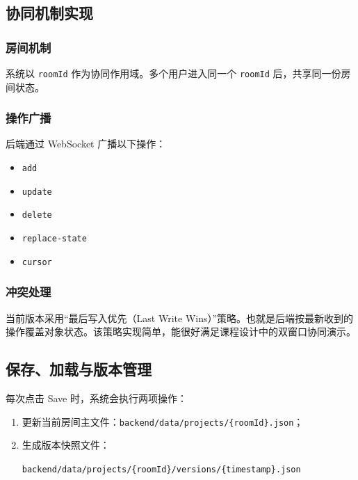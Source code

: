 \documentclass[supercite,macfont]{HustGSClassPaper}
\begin{document}
\subsection{协同机制实现}

\subsubsection{房间机制}

系统以 \texttt{roomId} 作为协同作用域。多个用户进入同一个 \texttt{roomId} 后，共享同一份房间状态。

\subsubsection{操作广播}

后端通过 WebSocket 广播以下操作：

\begin{itemize}[leftmargin=2em]
  \item \texttt{add}
  \item \texttt{update}
  \item \texttt{delete}
  \item \texttt{replace-state}
  \item \texttt{cursor}
\end{itemize}

\subsubsection{冲突处理}

当前版本采用“最后写入优先（Last Write Wins）”策略。也就是后端按最新收到的操作覆盖对象状态。该策略实现简单，能很好满足课程设计中的双窗口协同演示。

\subsection{保存、加载与版本管理}

每次点击 Save 时，系统会执行两项操作：

\begin{enumerate}[leftmargin=2em]
  \item 更新当前房间主文件：\texttt{backend/data/projects/\{roomId\}.json}；
  \item 生成版本快照文件：
  \begin{flushleft}
    \texttt{backend/data/projects/\{roomId\}/versions/\{timestamp\}.json}
  \end{flushleft}
\end{enumerate}
\end{document}
